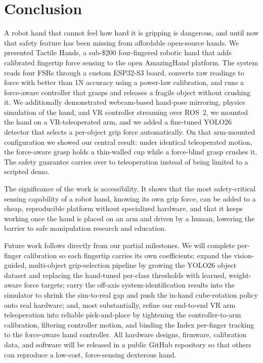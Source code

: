 \documentclass[acmlarge,screen,nonacm]{acmart}
\begin{document}
\section{Conclusion}
\label{sec:conclusion}
A robot hand that cannot feel how hard it is gripping is dangerous, and until
now that safety feature has been missing from affordable open-source hands. We
presented Tactile Hands, a sub-\$200 four-fingered robotic hand that adds
calibrated fingertip force sensing to the open AmazingHand platform. The system
reads four FSRs through a custom ESP32-S3 board, converts raw readings to force
with better than 1N accuracy using a power-law calibration, and runs a
force-aware controller that grasps and releases a fragile object without
crushing it. We additionally demonstrated webcam-based hand-pose mirroring,
physics simulation of the hand, and VR controller streaming over ROS~2, we
mounted the hand on a VR-teleoperated arm, and we added a fine-tuned YOLO26
detector that selects a per-object grip force automatically. On that arm-mounted
configuration we showed our central result: under identical teleoperated motion,
the force-aware grasp holds a thin-walled cup while a force-blind grasp crushes
it. The safety guarantee carries over to teleoperation instead of being limited
to a scripted demo.

The significance of the work is accessibility. It shows that the most
safety-critical sensing capability of a robot hand, knowing its own grip
force, can be added to a cheap, reproducible platform without specialized
hardware, and that it keeps working once the hand is placed on an arm and driven
by a human, lowering the barrier to safe manipulation research and education.

Future work follows directly from our partial milestones. We will complete
per-finger calibration so each fingertip carries its own coefficients; expand
the vision-guided, multi-object grip-selection pipeline by growing the YOLO26
object dataset and replacing the hand-tuned per-class thresholds with learned,
weight-aware force targets; carry the
off-axis system-identification results into the simulator to shrink the
sim-to-real gap and push the in-hand cube-rotation policy onto real hardware;
and, most substantially, refine our end-to-end VR arm teleoperation into
reliable pick-and-place by tightening the controller-to-arm calibration,
filtering controller motion, and binding the Index per-finger tracking to the
force-aware hand controller. All hardware designs, firmware, calibration data, and software
will be released in a public GitHub repository so that others can reproduce a
low-cost, force-sensing dexterous hand.



\end{document}
